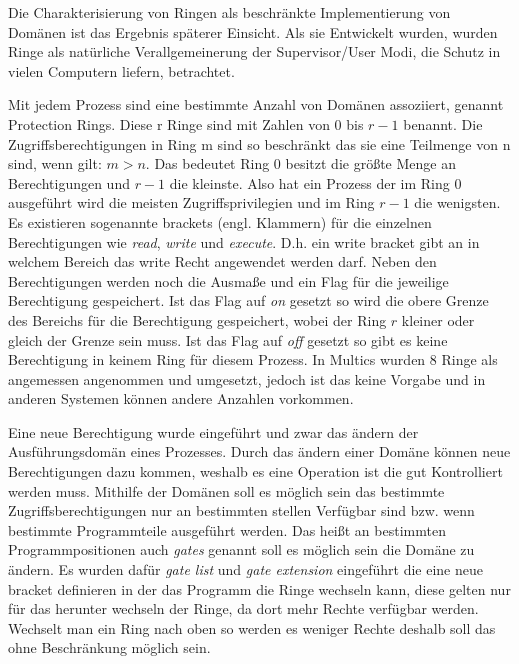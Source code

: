 \documentclass[11pt,technote]{IEEEtran}
\begin{document}
        Die Charakterisierung von Ringen als beschr\"ankte Implementierung von Dom\"anen ist das Ergebnis sp\"aterer Einsicht. 
        Als sie Entwickelt wurden, wurden Ringe als nat\"urliche Verallgemeinerung der Supervisor/User Modi, die Schutz in vielen Computern liefern, betrachtet.
    
        Mit jedem Prozess sind eine bestimmte Anzahl von Dom\"anen assoziiert, genannt Protection Rings. Diese r Ringe sind mit Zahlen von $0$ bis $r - 1$ benannt.
        Die Zugriffsberechtigungen in Ring m sind so beschr\"ankt das sie eine Teilmenge von n sind, wenn gilt: $m > n$. Das bedeutet
        Ring $0$ besitzt die gr\"o\ss te Menge an Berechtigungen und $r-1$ die kleinste. Also hat ein Prozess der im Ring $0$ ausgef\"uhrt wird
        die meisten Zugriffsprivilegien und im Ring $r-1$ die wenigsten. Es existieren sogenannte brackets (engl. Klammern) f\"ur die einzelnen Berechtigungen
        wie \textit{read}, \textit{write} und \textit{execute}. D.h. ein write bracket gibt an in welchem Bereich das write Recht angewendet werden darf. Neben den 
        Berechtigungen werden noch die Ausma\ss e und ein Flag f\"ur die jeweilige Berechtigung gespeichert. Ist das Flag auf \textit{on} gesetzt 
        so wird die obere Grenze des Bereichs f\"ur die Berechtigung gespeichert, wobei der Ring $r$ kleiner oder gleich der Grenze sein muss.
        Ist das Flag auf \textit{off} gesetzt so gibt es keine Berechtigung in keinem Ring f\"ur diesem Prozess. In Multics wurden 8 Ringe als angemessen 
        angenommen und umgesetzt, jedoch ist das keine Vorgabe und in anderen Systemen k\"onnen andere Anzahlen vorkommen.
    
        Eine neue Berechtigung wurde eingef\"uhrt und zwar das \"andern der Ausf\"uhrungsdom\"an eines Prozesses.
        Durch das \"andern einer Dom\"ane k\"onnen neue Berechtigungen dazu kommen, weshalb es eine Operation ist die gut Kontrolliert werden muss.
        Mithilfe der Dom\"anen soll es m\"oglich sein das bestimmte Zugriffsberechtigungen nur an bestimmten stellen Verf\"ugbar  sind bzw. wenn bestimmte Programmteile 
        ausgef\"uhrt werden. Das hei\ss t an bestimmten Programmpositionen auch \textit{gates} genannt soll es m\"oglich sein die Dom\"ane zu \"andern.
        Es wurden daf\"ur \textit{gate list} und \textit{gate extension} eingef\"uhrt die eine neue bracket definieren in der das Programm die Ringe wechseln kann, diese
        gelten nur f\"ur das herunter wechseln der Ringe, da dort mehr Rechte verf\"ugbar werden. Wechselt man ein Ring nach oben so werden es weniger Rechte deshalb
        soll das ohne Beschr\"ankung m\"oglich sein. 
    
\end{document}
